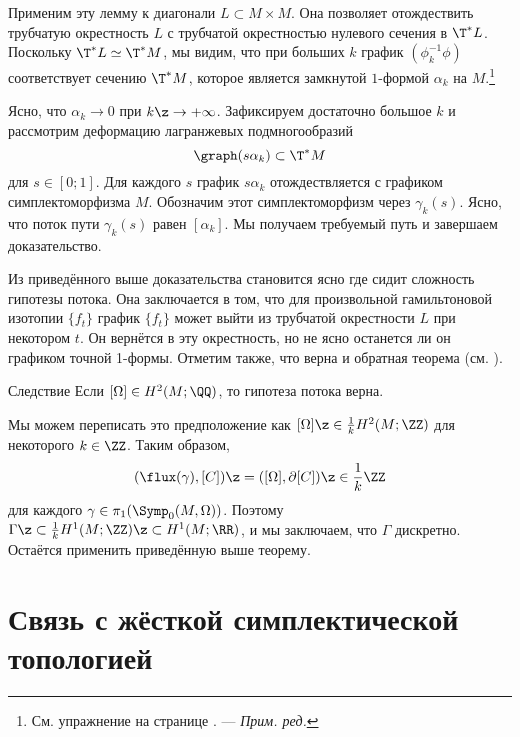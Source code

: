 Применим эту лемму к диагонали $L \subset M \times M$.
Она позволяет отождествить трубчатую окрестность $L$ с трубчатой
окрестностью нулевого сечения в $\T^\ast L$. 
Поскольку $\T^\ast L \simeq \T^\ast M$, мы видим, что при больших $k$
график $(\phi_k^{-1}\phi)$ соответствует сечению $\T^\ast M$, которое
является замкнутой $1$-формой $\alpha_k$ на
$M$.\footnote{См. упражнение на странице
  \pageref{1-form-lagrange}. — \textit{Прим. ред.}} 

Ясно, что $\alpha_k \to 0$ при $k\z\to +\infty$.
Зафиксируем достаточно большое $k$ и рассмотрим деформацию лагранжевых
подмногообразий  
\[\graph (s\alpha_k) \subset \T^\ast M\]
для $s \in [0;1]$.
Для каждого $s$ график $s\alpha_k$ отождествляется с графиком симплектоморфизма $M$.
Обозначим этот симплектоморфизм через $\gamma_k(s)$.
Ясно, что поток пути $\gamma_k(s)$ равен $[\alpha_k]$.
Мы получаем требуемый путь и завершаем доказательство.
\qeds

Из приведённого выше доказательства становится ясно где сидит
сложность гипотезы потока. 
Она заключается в том, что для произвольной гамильтоновой изотопии
$\{f_t\}$ график $\{f_t\}$ может выйти из трубчатой окрестности $L$
при некотором $t$. 
Он вернётся в эту окрестность, но не ясно останется ли он графиком
точной 1-формы. 
Отметим также, что верна и обратная теорема (см. \cite{LMP1}).

\begin{thm}{Следствие}
Если $[\Omega] \in H^2(M;\QQ)$, то гипотеза потока верна.
\end{thm}

Мы можем переписать это предположение как $[\Omega] \z\in
\tfrac1kH^2(M;\ZZ)$ для некоторого $k\in\ZZ$.
Таким образом,
\[(\flux(\gamma), [C]) \z= ([\Omega], \partial[C]) \z\in \frac1k\ZZ\]
для каждого $\gamma \in \pi_1(\Symp_0(M,\Omega))$. 
Поэтому $\Gamma\z\subset \tfrac1k H^1(M;\ZZ)\z\subset H^1(M;\RR)$, и мы
заключаем, что $\Gamma$ дискретно. 
Остаётся применить приведённую выше теорему.
\qeds

\section{Связь с жёсткой симплектической топологией}

